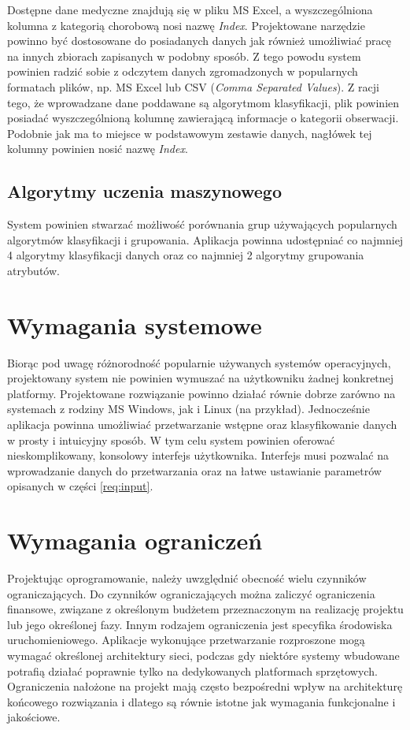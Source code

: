 \documentclass[../thesis.tex]{subfiles}
\begin{document}
Dostępne dane medyczne znajdują się w pliku MS Excel, a wyszczególniona kolumna z kategorią chorobową nosi nazwę \emph{Index}. Projektowane narzędzie powinno być dostosowane do posiadanych danych jak również umożliwiać pracę na innych zbiorach zapisanych w podobny sposób. Z tego powodu system powinien radzić sobie z odczytem danych zgromadzonych w popularnych formatach plików, np. MS Excel lub CSV (\textit{Comma Separated Values}). Z racji tego, że wprowadzane dane poddawane są algorytmom klasyfikacji, plik powinien posiadać wyszczególnioną kolumnę zawierającą informacje o kategorii obserwacji. Podobnie jak ma to miejsce w podstawowym zestawie danych, nagłówek tej kolumny powinien nosić nazwę \textit{Index}.

\subsection{Algorytmy uczenia maszynowego}

System powinien stwarzać możliwość porównania grup używających popularnych algorytmów klasyfikacji i grupowania. Aplikacja powinna udostępniać co najmniej 4 algorytmy klasyfikacji danych oraz co najmniej 2 algorytmy grupowania atrybutów.

\section{Wymagania systemowe}

Biorąc pod uwagę różnorodność popularnie używanych systemów operacyjnych, projektowany system nie powinien wymuszać na użytkowniku żadnej konkretnej platformy. Projektowane rozwiązanie powinno działać równie dobrze zarówno na systemach z rodziny MS Windows, jak i Linux (na przykład). Jednocześnie aplikacja powinna umożliwiać przetwarzanie wstępne oraz klasyfikowanie danych w prosty i intuicyjny sposób. W tym celu system powinien oferować nieskomplikowany, konsolowy interfejs użytkownika. Interfejs musi pozwalać na wprowadzanie danych do przetwarzania oraz na łatwe ustawianie parametrów opisanych w części \ref{req:input}.

\section{Wymagania ograniczeń}

Projektując oprogramowanie, należy uwzględnić obecność wielu czynników ograniczających. Do czynników ograniczających można zaliczyć ograniczenia finansowe, związane z określonym budżetem przeznaczonym na realizację projektu lub jego określonej fazy. Innym rodzajem ograniczenia jest specyfika środowiska uruchomieniowego. Aplikacje wykonujące przetwarzanie rozproszone mogą wymagać określonej architektury sieci, podczas gdy niektóre systemy wbudowane potrafią działać poprawnie tylko na dedykowanych platformach sprzętowych. Ograniczenia nałożone na projekt mają często bezpośredni wpływ na architekturę końcowego rozwiązania i dlatego są równie istotne jak wymagania funkcjonalne i jakościowe.
\end{document}
